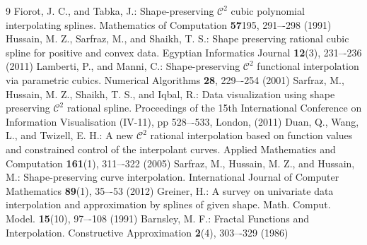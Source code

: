 \documentclass[runningheads]{llncs}
\begin{document}
	\begin{thebibliography}{9}
		 Fiorot, J. C., and Tabka, J.: Shape-preserving $\mathcal{C}^2$ cubic polynomial interpolating splines. Mathematics of Computation \textbf{57}195, 291–-298 (1991)
		 Hussain, M. Z., Sarfraz, M., and Shaikh, T. S.: Shape preserving rational cubic spline for positive and convex data. Egyptian Informatics Journal \textbf{12}(3), 231–-236 (2011)
		 Lamberti, P., and Manni, C.: Shape-preserving $\mathcal{C}^2$ functional interpolation via parametric cubics. Numerical Algorithms \textbf{28}, 229–-254 (2001)
		 Sarfraz, M., Hussain, M. Z., Shaikh, T. S., and Iqbal, R.: Data visualization using shape preserving $\mathcal{C}^2$ rational spline. Proceedings of the 15th International Conference on Information
		Visualisation (IV-11), pp 528–-533, London, (2011)
		 Duan, Q., Wang, L., and Twizell, E. H.: A new $\mathcal{C}^2$ rational interpolation based on function values and constrained control of the interpolant curves. Applied Mathematics and Computation \textbf{161}(1), 311–-322 (2005)
		 Sarfraz, M., Hussain, M. Z., and Hussain, M.: Shape-preserving curve interpolation. International Journal of Computer Mathematics \textbf{89}(1), 35–-53 (2012)
		 Greiner, H.: A survey on univariate data interpolation and approximation by splines of given shape. Math. Comput. Model. \textbf{15}(10), 97–-108 (1991)
		 Barnsley, M. F.: Fractal Functions and Interpolation. Constructive Approximation \textbf{2}(4), 303–-329 (1986)

\end{thebibliography}
\end{document}
